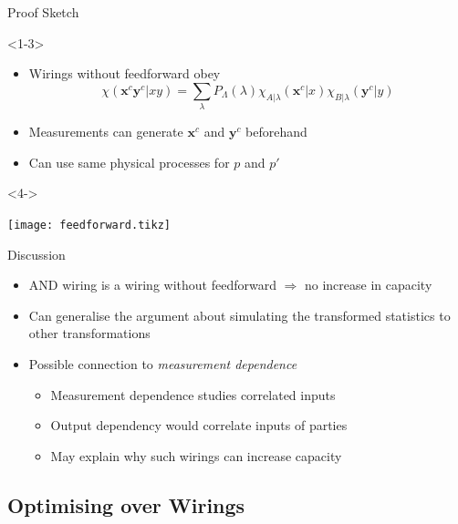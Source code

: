 \documentclass[xcolor=dvipsnames]{beamer}
\newcommand{\?}{\mathrel{?}} %
\newcommand{\cvec}[1]{\boldsymbol{\mathbf{#1}}}    %
\begin{document}
\begin{frame}{Proof Sketch}
  \begin{onlyenv}<1-3>
    \begin{itemize}[<+->]
      \item Wirings without feedforward obey
        \[ \chi(\cvec{x}^c\cvec{y}^c|xy) = \sum_{\lambda} P_{\Lambda}(\lambda) \chi_{A|\lambda}(\cvec{x}^c|x) \chi_{B|\lambda}(\cvec{y}^c|y) \]
      \item Measurements can generate \(\cvec{x}^c\) and \(\cvec{y}^c\) beforehand
      \item Can use same physical processes for \(p\) and \(p'\)
    \end{itemize}
  \end{onlyenv}
  \begin{onlyenv}<4->
    \begin{center}
      \texttt{[image: feedforward.tikz]}
    \end{center}
  \end{onlyenv}
\end{frame}


\begin{frame}{Discussion}
  \begin{itemize}[<+->]
    \item AND wiring is a wiring without feedforward \(\Rightarrow\) no increase in capacity
    \item Can generalise the argument about simulating the transformed statistics to other transformations
    \item Possible connection to \emph{measurement dependence}
      \begin{itemize}
        \item Measurement dependence studies correlated inputs
        \item Output dependency would correlate inputs of parties
        \item May explain why such wirings can increase capacity
      \end{itemize}
  \end{itemize}
\end{frame}

\subsection{Optimising over Wirings}
\end{document}
